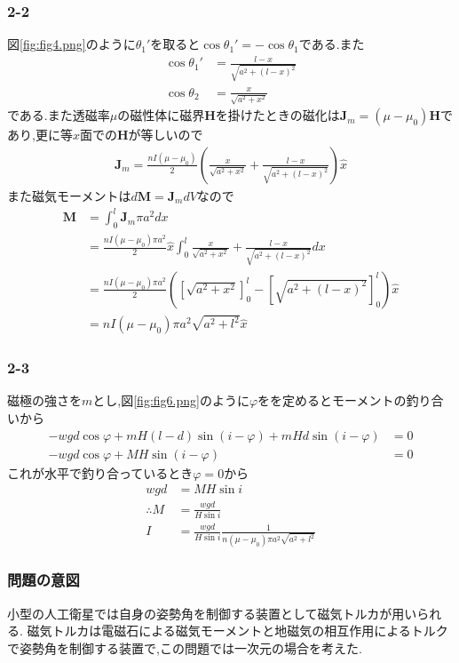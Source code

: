 \subsubsection*{2-2}
図\ref{fig:fig4.png}のように$\theta_1'$を取ると$\cos\theta_1'=-\cos\theta_1$である.また
\begin{align*}
  \cos\theta_1' & =\frac{l-x}{\sqrt{a^2+(l-x)^2}} \\
  \cos\theta_2  & =\frac{x}{\sqrt{a^2+x^2}}
\end{align*}
である.また透磁率$\mu$の磁性体に磁界${\bm H}$を掛けたときの磁化は${\bm J}_m=(\mu-\mu_0){\bm H}$であり,更に等$x$面での${\bm H}$が等しいので
\begin{align*}
  {\bm J}_m=\frac{nI(\mu-\mu_0)}{2}\left(\frac{x}{\sqrt{a^2+x^2}}+\frac{l-x}{\sqrt{a^2+(l-x)^2}}\right)\hat{x}
\end{align*}
また磁気モーメントは$d{\bm M}={\bm J}_mdV$なので
\begin{align*}
  {\bm M} & =\int_0^l{\bm J}_m\pi a^2dx                                                                                            \\
          & =\frac{nI(\mu-\mu_0)\pi a^2}{2}\hat{x}\int_0^l\frac{x}{\sqrt{a^2+x^2}}+\frac{l-x}{\sqrt{a^2+(l-x)^2}}dx                \\
          & =\frac{nI(\mu-\mu_0)\pi a^2}{2}\left(\left[\sqrt{a^2+x^2}\right]_0^l-\left[\sqrt{a^2+(l-x)^2}\right]_0^l\right)\hat{x} \\
          & =nI(\mu-\mu_0)\pi a^2\sqrt{a^2+l^2}\hat{x}
\end{align*}
\subsubsection*{2-3}
磁極の強さを$m$とし,図\ref{fig:fig6.png}のように$\varphi$をを定めるとモーメントの釣り合いから
\begin{align*}
  -wgd\cos\varphi+mH(l-d)\sin(i-\varphi)+mHd\sin(i-\varphi) & =0 \\
  -wgd\cos\varphi+MH\sin(i-\varphi)                         & =0
\end{align*}
これが水平で釣り合っているとき$\varphi=0$から
\begin{align*}
  wgd          & =MH\sin i                                                       \\
  \therefore M & =\frac{wgd}{H\sin i}                                            \\
  I            & =\frac{wgd}{H\sin i}\frac{1}{n(\mu-\mu_0)\pi a^2\sqrt{a^2+l^2}}
\end{align*}
\subsubsection*{問題の意図}
小型の人工衛星では自身の姿勢角を制御する装置として磁気トルカが用いられる.
磁気トルカは電磁石による磁気モーメントと地磁気の相互作用によるトルクで姿勢角を制御する装置で,この問題では一次元の場合を考えた.